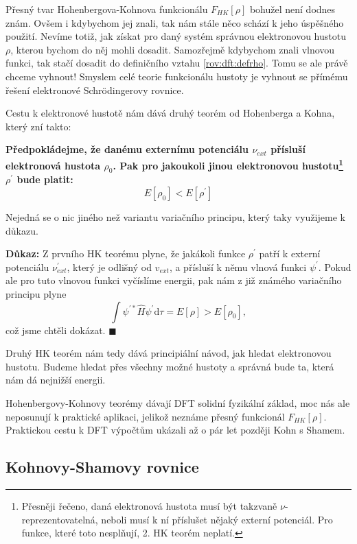 Přesný tvar Hohenbergova-Kohnova funkcionálu $F_{HK}[\rho]$ bohužel není dodnes znám. 
Ovšem i kdybychom jej znali, tak nám stále něco schází k jeho úspěšného použití. Nevíme totiž, jak získat pro daný systém správnou elektronovou hustotu $\rho$, kterou bychom do něj mohli dosadit. Samozřejmě kdybychom znali vlnovou funkci, tak stačí dosadit do definičního vztahu \eqref{rov:dft:defrho}. Tomu se ale právě chceme vyhnout! Smyslem celé teorie funkcionálu hustoty je vyhnout se přímému řešení elektronové Schr\"{o}dingerovy rovnice.

Cestu k elektronové hustotě nám dává druhý teorém od Hohenberga a Kohna, který zní takto:

\bigskip
\textbf{Předpokládejme, že danému externímu potenciálu $\nu_{ext}$ přísluší elektronová hustota $\rho_0$. Pak pro jakoukoli jinou elektronovou hustotu\footnote{Přesněji řečeno, daná elektronová hustota musí být takzvaně $\nu$-{reprezentovatelná}, neboli musí k ní příslušet nějaký externí potenciál. Pro funkce, které toto nesplňují, 2. HK teorém neplatí.} $\rho^{\prime}$ bude platit:}
\begin{equation}
E[\rho_0] < E[\rho^{\prime}]
\label{rov:dft:HK2}
\end{equation}

Nejedná se o nic jiného než variantu variačního principu, který taky využijeme k důkazu.

\bigskip
\textbf{Důkaz:} Z prvního HK teorému plyne, že jakákoli funkce $\rho^{\prime}$ patří k externí potenciálu $\nu_{ext}^{\prime}$, který je odlišný od $v_{ext}$, a přísluší k němu vlnová funkci $\psi^{\prime}$. Pokud ale pro tuto vlnovou funkci vyčíslíme energii, pak nám z již známého variačního principu plyne
\begin{equation}
\int \psi^{\prime *} \hat{H} \psi^{\prime} \mathrm{d}\tau = E[\rho] > E [\rho_0],
\end{equation}
což jsme chtěli dokázat. \hfill {\footnotesize $\blacksquare$}

Druhý HK teorém nám tedy dává principiální návod, jak hledat elektronovou hustotu. Budeme hledat přes všechny možné hustoty a správná bude ta, která nám dá nejnižší energii.

Hohenbergovy-Kohnovy teorémy dávají DFT solidní fyzikální základ, moc nás ale neposunují k praktické aplikaci, jelikož neznáme přesný funkcionál $F_{HK}[\rho]$.
Praktickou cestu k DFT výpočtům ukázali až o pár let později Kohn s Shamem.

\subsection{Kohnovy-Shamovy rovnice}

